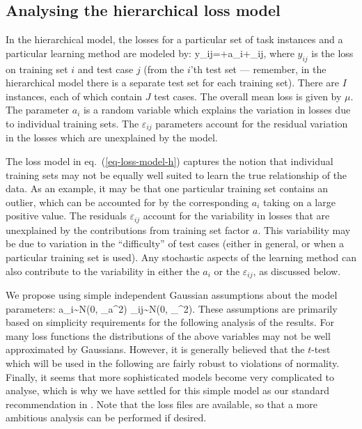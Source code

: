 \subsection{Analysing the hierarchical loss model}

In the hierarchical model, the losses for a particular set of task
instances and a particular learning method are modeled by:
\beq
y_{ij}=\mu+a_i+\varepsilon_{ij},
\label{eq-loss-model-h}
\eeq
where $y_{ij}$ is the loss on training set $i$ and test case
$j$ (from the $i$'th test set --- remember, in the hierarchical model
there is a separate test set for each training set). There are $I$
instances, each of which contain $J$ test cases. The overall mean loss
is given by $\mu$. The parameter $a_i$ is a random variable which
explains the variation in losses due to individual training sets. The
$\varepsilon_{ij}$ parameters account for the residual variation in
the losses which are unexplained by the model.

The loss model in eq.~(\ref{eq-loss-model-h}) captures the notion that
individual training sets may not be equally well suited to learn the
true relationship of the data. As an example, it may be that one
particular training set contains an outlier, which can be accounted
for by the corresponding $a_i$ taking on a large positive value. The
residuals $\varepsilon_{ij}$ account for the variability in losses
that are unexplained by the contributions from training set factor
$a$.  This variability may be due to variation in the ``difficulty''
of test cases (either in general, or when a particular training set is
used).  Any stochastic aspects of the learning method can also 
contribute to the variability in either the $a_i$ or the $\varepsilon_{ij}$,
as discussed below.

We propose using simple independent Gaussian assumptions about the
model parameters:
\beq
a_i\sim {\cal N}(0, \sigma_a^2) \hspace{4cm}
\varepsilon_{ij}\sim {\cal N}(0, \sigma_\varepsilon^2).
\label{eq-model-h}
\eeq
These assumptions are primarily based on simplicity requirements for
the following analysis of the results. For many loss functions the
distributions of the above variables may not be well approximated by
Gaussians. However, it is generally believed that the $t$-test which
will be used in the following are fairly robust to violations of
normality.  Finally, it seems that more sophisticated models become
very complicated to analyse, which is why we have settled for this
simple model as our standard recommendation in \delve{}. Note that the
loss files are available, so that a more ambitious analysis can be
performed if desired.

